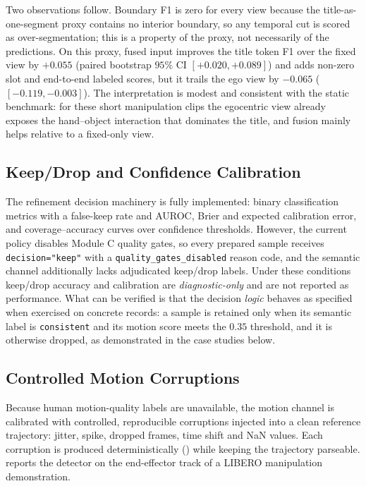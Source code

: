 \documentclass[11pt,oneside]{report}
\begin{document}
Two observations follow. Boundary F1 is zero for every view because the
title-as-one-segment proxy contains no interior boundary, so any temporal cut is
scored as over-segmentation; this is a property of the proxy, not necessarily of
the predictions. On this proxy, fused input improves the title token F1 over the
fixed view by $+0.055$ (paired bootstrap $95\%$ CI $[+0.020, +0.089]$) and adds
non-zero slot and end-to-end labeled scores, but it trails the ego view by
$-0.065$ ($[-0.119, -0.003]$). The interpretation is modest and consistent with
the static benchmark: for these short manipulation clips the egocentric view
already exposes the hand--object interaction that dominates the title, and fusion
mainly helps relative to a fixed-only view.

\subsection{Keep/Drop and Confidence Calibration}
The refinement decision machinery is fully implemented: binary
classification metrics with a false-keep rate and AUROC, Brier and expected
calibration error, and coverage--accuracy curves over confidence thresholds.
However, the current policy disables Module C quality gates, so every prepared
sample receives \texttt{decision="keep"} with a \texttt{quality\_gates\_disabled}
reason code, and the semantic channel additionally lacks adjudicated keep/drop
labels. Under these conditions keep/drop accuracy and calibration are
\emph{diagnostic-only} and are not reported as performance. What can be verified
is that the decision \emph{logic} behaves as specified when exercised on concrete
records: a sample is retained only when its semantic label is
\texttt{consistent} and its motion score meets the $0.35$ threshold, and it is
otherwise dropped, as demonstrated in the case studies below.

\subsection{Controlled Motion Corruptions}
Because human motion-quality labels are unavailable, the motion channel is
calibrated with controlled, reproducible corruptions injected into a clean
reference trajectory: jitter, spike, dropped frames, time shift and NaN values.
Each corruption is produced deterministically
() while keeping the trajectory
parseable.  reports the detector on the end-effector track
of a LIBERO manipulation demonstration.
\end{document}

